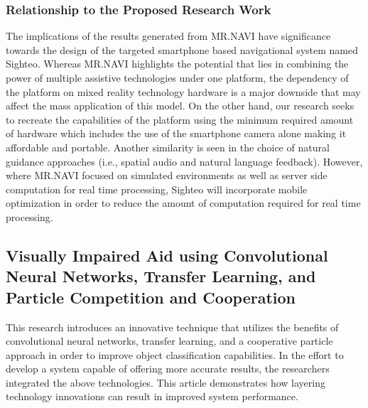 \documentclass{FastFyp}
\begin{document}
\subsubsection{Relationship to the Proposed Research Work}  
The implications of the results generated from MR.NAVI \cite{ref:pfitzer2025mr} have significance towards the design of the targeted smartphone based navigational system named Sighteo. Whereas MR.NAVI highlights the potential that lies in combining the power of multiple assistive technologies under one platform, the dependency of the platform on mixed reality technology hardware is a major downside that may affect the mass application of this model. On the other hand, our research seeks to recreate the capabilities of the platform using the minimum required amount of hardware which includes the use of the smartphone camera alone making it affordable and portable. Another similarity is seen in the choice of natural guidance approaches (i.e., spatial audio and natural language feedback). However, where MR.NAVI focused on simulated environments as well as server side computation for real time processing, Sighteo will incorporate mobile optimization in order to reduce the amount of computation required for real time processing.

\subsection{Visually Impaired Aid using Convolutional Neural Networks, Transfer Learning, and Particle Competition and Cooperation}
This research introduces an innovative technique that utilizes the benefits of convolutional neural networks, transfer learning, and a cooperative particle approach in order to improve object classification capabilities. In the effort to develop a system capable of offering more accurate results, the researchers integrated the above technologies. This article demonstrates how layering technology innovations can result in improved system performance.
\end{document}
